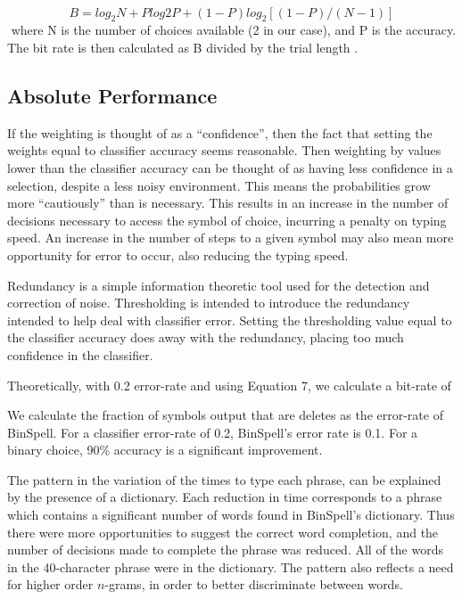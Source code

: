 \documentclass[12pt,titlepage]{article}
\begin{document}
$ $ \[ \begin{equation}
	B = log_2 N + P log2P + (1-P)log_2[(1-P)/(N-1)]\tag{7}
\end{equation} \] $ $
where N is the number of choices available (2 in our case), and P is the accuracy.  The bit rate is then calculated as B divided by the trial length \cite{wolpaw_braincomputer_2002} \cite{mcfarland2003brain} \cite{millan2004}.

\subsection{Absolute Performance}

If the weighting is thought of as a ``confidence'', then the fact that setting the weights equal to 
classifier accuracy seems reasonable.  Then weighting by values lower than the classifier 
accuracy can be thought of as having less confidence in a selection, despite a less noisy 
environment.  This means the probabilities grow more ``cautiously'' than is necessary.  This 
results in an increase in the number of decisions necessary to access the symbol of choice, 
incurring a penalty on typing speed.  An increase in the number of steps to a given symbol may 
also mean more opportunity for error to occur, also reducing the typing speed.

Redundancy is a simple information theoretic tool used for the detection and correction of noise.  Thresholding is intended to introduce the redundancy intended to help deal with classifier error.  Setting the thresholding value equal to the classifier accuracy does away with the redundancy, placing too much confidence in the classifier.

Theoretically, with 0.2 error-rate and using Equation 7, we calculate a bit-rate of 

We calculate the fraction of symbols output that are deletes as the error-rate of BinSpell.  For a classifier error-rate of 0.2, BinSpell's error rate is 0.1.  For a binary choice, 90\% accuracy is a significant improvement.  

The pattern in the variation of the times to type each phrase, can be explained by 
the presence of a dictionary.  Each reduction in time corresponds to a phrase 
which contains a significant number of words found in BinSpell's dictionary.  Thus there were 
more opportunities to suggest the correct word completion, and the number of decisions made 
to complete the phrase was reduced.  All of the words in the 40-character phrase were in the 
dictionary.  The pattern also reflects a need for higher order $n$-grams, in order to better 
discriminate between words.
\end{document}
